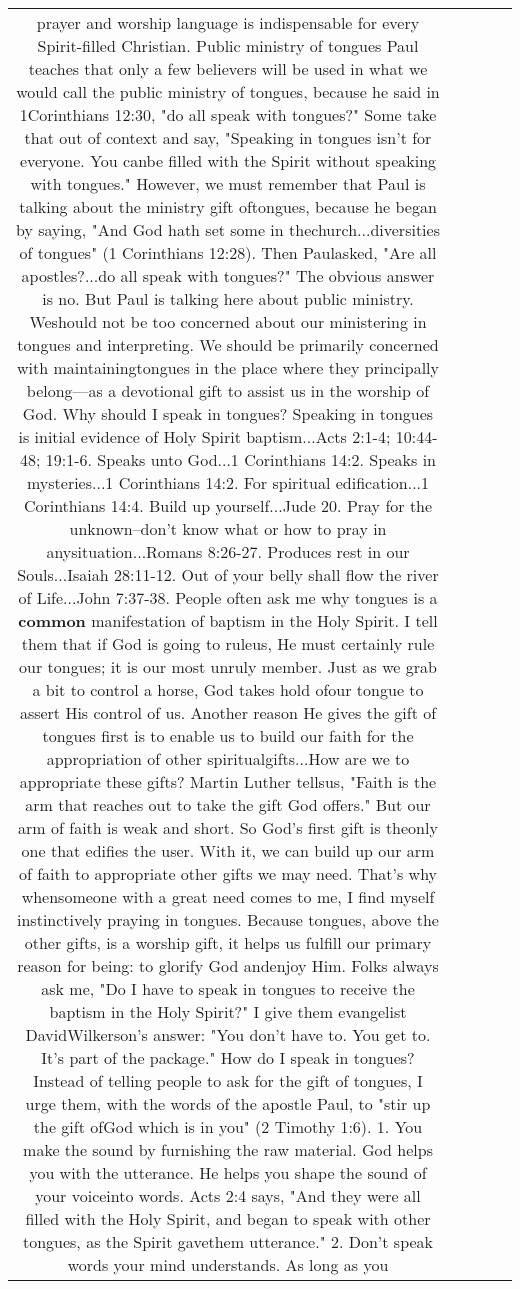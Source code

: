 \documentclass[11pt]{article}
\newlength\mylength
\begin{document}
\begin{center}
\begin{longtable}{|C{.65\mylength}|C{.30\mylength}|C{.12\mylength}|C{.12\mylength}|C{.12\mylength}|}
prayer and worship language is indispensable for every Spirit-filled Christian.  Public ministry of tongues  Paul teaches that only a few believers will be used in what we would call the public ministry of tongues, because he said in 1Corinthians 12:30, "do all speak with tongues?" Some take that out of context and say, "Speaking in tongues isn't for everyone. You canbe filled with the Spirit without speaking with tongues." However, we must remember that Paul is talking about the ministry gift oftongues, because he began by saying, "And God hath set some in thechurch...diversities of tongues" (1 Corinthians 12:28). Then Paulasked, "Are all apostles?...do all speak with tongues?" The obvious answer is no. But Paul is talking here about public ministry. Weshould not be too concerned about our ministering in tongues and interpreting. We should be primarily concerned with maintainingtongues in the place where they principally belong—as a devotional gift to assist us in the worship of God.  Why should I speak in tongues?   Speaking in tongues is initial evidence of Holy Spirit baptism...Acts 2:1-4; 10:44-48; 19:1-6.  Speaks unto God...1 Corinthians 14:2.  Speaks in mysteries...1 Corinthians 14:2.  For spiritual edification...1 Corinthians 14:4.  Build up yourself...Jude 20.  Pray for the unknown--don't know what or how to pray in anysituation...Romans 8:26-27.  Produces rest in our Souls...Isaiah 28:11-12.  Out of your belly shall flow the river of Life...John 7:37-38.  People often ask me why tongues is a \textbf{common} manifestation of baptism in the Holy Spirit. I tell them that if God is going to ruleus, He must certainly rule our tongues; it is our most unruly member. Just as we grab a bit to control a horse, God takes hold ofour tongue to assert His control of us.  Another reason He gives the gift of tongues first is to enable us to build our faith for the appropriation of other spiritualgifts...How are we to appropriate these gifts? Martin Luther tellsus, "Faith is the arm that reaches out to take the gift God offers." But our arm of faith is weak and short. So God's first gift is theonly one that edifies the user. With it, we can build up our arm of faith to appropriate other gifts we may need. That's why whensomeone with a great need comes to me, I find myself instinctively praying in tongues.  Because tongues, above the other gifts, is a worship gift, it helps us fulfill our primary reason for being: to glorify God andenjoy Him.  Folks always ask me, "Do I have to speak in tongues to receive the baptism in the Holy Spirit?" I give them evangelist DavidWilkerson's answer: "You don't have to. You get to. It's part of the package."  How do I speak in tongues?  Instead of telling people to ask for the gift of tongues, I urge them, with the words of the apostle Paul, to "stir up the gift ofGod which is in you" (2 Timothy 1:6).  1. You make the sound by furnishing the raw material. God helps you with the utterance. He helps you shape the sound of your voiceinto words. Acts 2:4 says, "And they were all filled with the Holy Spirit, and began to speak with other tongues, as the Spirit gavethem utterance."  2. Don't speak words your mind understands. As long as you 
\end{longtable}
\end{center}
\end{document}
